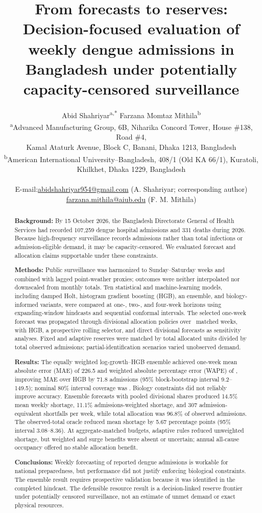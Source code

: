 \documentclass[11pt]{article}
\title{From forecasts to reserves: Decision-focused evaluation of weekly dengue admissions in Bangladesh under potentially capacity-censored surveillance}
\author{
Abid Shahriyar\textsuperscript{a,*}\qquad
Farzana Momtaz Mithila\textsuperscript{b}\\[0.7em]
\small \textsuperscript{a}Advanced Manufacturing Group, 6B, Niharika Concord Tower, House \#138, Road \#4,\\
\small Kamal Ataturk Avenue, Block C, Banani, Dhaka 1213, Bangladesh\\
\small \textsuperscript{b}American International University--Bangladesh, 408/1 (Old KA 66/1), Kuratoli,\\
\small Khilkhet, Dhaka 1229, Bangladesh\\[0.35em]
\small
\begin{tabular}{@{}rl@{}}
E-mail: & \href{mailto:abidshahriyar954@gmail.com}{abidshahriyar954@gmail.com} (A. Shahriyar; corresponding author)\\
        & \href{mailto:farzana.mithila@aiub.edu}{farzana.mithila@aiub.edu} (F. M. Mithila)
\end{tabular}
}
\date{}
\begin{document}
\maketitle

\begin{abstract}
\textbf{Background:} By 15 October 2026, the Bangladesh Directorate General of Health Services had recorded 107,259 dengue hospital admissions and 331 deaths during 2026. Because high-frequency surveillance records admissions rather than total infections or admission-eligible demand, it may be capacity-censored. We evaluated forecast and allocation claims supportable under these constraints.

\textbf{Methods:} Public surveillance was harmonized to Sunday--Saturday weeks and combined with lagged point-weather proxies; outcomes were neither interpolated nor downscaled from monthly totals. Ten statistical and machine-learning models, including damped Holt, histogram gradient boosting (HGB), an ensemble, and biology-informed variants, were compared at one-, two-, and four-week horizons using expanding-window hindcasts and sequential conformal intervals. The selected one-week forecast was propagated through divisional allocation policies over \JointWeeks\ matched weeks, with HGB, a prospective rolling selector, and direct divisional forecasts as sensitivity analyses. Fixed and adaptive reserves were matched by total allocated units divided by total observed admissions; partial-identification scenarios varied unobserved demand.

\textbf{Results:} The equally weighted log-growth--HGB ensemble achieved one-week mean absolute error (MAE) of 226.5 and weighted absolute percentage error (WAPE) of \ForecastWAPE, improving MAE over HGB by 71.8 admissions (95\% block-bootstrap interval 9.2--149.5); nominal 80\% interval coverage was \ForecastCoverage. Biology constraints did not reliably improve accuracy. Ensemble forecasts with pooled divisional shares produced 14.5\% mean weekly shortage, 11.1\% admissions-weighted shortage, and 307 admission-equivalent shortfalls per week, while total allocation was 96.8\% of observed admissions. The observed-total oracle reduced mean shortage by 5.67 percentage points (95\% interval 3.08--8.36). At aggregate-matched budgets, adaptive rules reduced unweighted shortage, but weighted and surge benefits were absent or uncertain; annual all-cause occupancy offered no stable allocation benefit.

\textbf{Conclusions:} Weekly forecasting of reported dengue admissions is workable for national preparedness, but performance did not justify enforcing biological constraints. The ensemble result requires prospective validation because it was identified in the completed hindcast. The defensible resource result is a decision-linked reserve frontier under potentially censored surveillance, not an estimate of unmet demand or exact physical resources.
\end{abstract}
\end{document}
